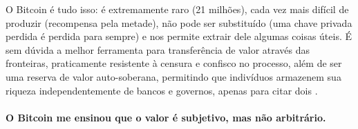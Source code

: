 O Bitcoin é tudo isso: é extremamente raro (21 milhões), cada vez mais difícil de 
produzir (recompensa pela metade), não pode ser substituído (uma chave privada perdida 
é perdida para sempre) e nos permite extrair dele algumas coisas úteis. É sem dúvida a melhor 
ferramenta para transferência de valor através das fronteiras, praticamente resistente à 
censura e confisco no processo, além de ser uma reserva de valor auto-soberana, permitindo 
que indivíduos armazenem sua riqueza independentemente de bancos e governos, apenas para 
citar dois .

\paragraph{O Bitcoin me ensinou que o valor é subjetivo, mas não arbitrário.}

%
%
%
%
